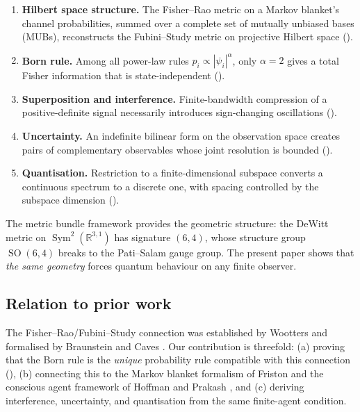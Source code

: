 \documentclass[12pt,a4paper]{article}
\theoremstyle{definition}
\newcommand{\SO}{\operatorname{SO}}
\newcommand{\Sym}{\operatorname{Sym}}
\newcommand{\R}{\mathbb{R}}
\begin{document}
\begin{enumerate}[label=(\roman*)]
\item \textbf{Hilbert space structure.} The Fisher--Rao metric on a
  Markov blanket's channel probabilities, summed over a complete set of
  mutually unbiased bases (MUBs), reconstructs the Fubini--Study metric
  on projective Hilbert space ().
\item \textbf{Born rule.} Among all power-law rules
  $p_i \propto |\psi_i|^\alpha$, only $\alpha = 2$ gives a total
  Fisher information that is state-independent
  ().
\item \textbf{Superposition and interference.} Finite-bandwidth
  compression of a positive-definite signal necessarily introduces
  sign-changing oscillations ().
\item \textbf{Uncertainty.} An indefinite bilinear form on the
  observation space creates pairs of complementary observables whose
  joint resolution is bounded ().
\item \textbf{Quantisation.} Restriction to a finite-dimensional
  subspace converts a continuous spectrum to a discrete one, with
  spacing controlled by the subspace dimension
  ().
\end{enumerate}

The metric bundle framework \cite{Paper1,Paper2,Paper3,Paper4,Paper5}
provides the geometric structure: the DeWitt metric on
$\Sym^2(\R^{3,1})$ has signature $(6,4)$, whose structure group
$\SO(6,4)$ breaks to the Pati--Salam gauge group. The present paper
shows that \emph{the same geometry} forces quantum behaviour on any
finite observer.

\subsection{Relation to prior work}

The Fisher--Rao/Fubini--Study connection was established by Wootters
\cite{Wootters1981} and formalised by Braunstein and Caves
\cite{BraunsteinCaves1994}. Our contribution is threefold: (a) proving that
the Born rule is the \emph{unique} probability rule compatible with this
connection (), (b) connecting this to the
Markov blanket formalism of Friston \cite{Friston2013} and the
conscious agent framework of Hoffman and Prakash
\cite{HoffmanPrakash2014}, and (c) deriving interference, uncertainty,
and quantisation from the same finite-agent condition.
\end{document}
